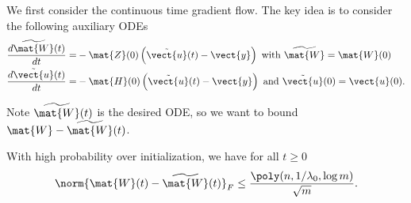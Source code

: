 We first consider the continuous time gradient flow.
The key idea is to consider the following auxiliary ODEs\begin{align*}
\frac{d\widetilde{\mat{W}}(t)}{dt} = &- \mat{Z}(0) \left(\tilde{\vect{u}}(t)-\vect{y}\right) \text{ with } \widetilde{\mat{W}} = \mat{W}(0) \\
\frac{d\tilde{\vect{u}}(t)}{dt} = &- \mat{H}(0)\left(\tilde{\vect{u}}(t)-\vect{y}\right) \text{ and }\tilde{\vect{u}}(0) = \vect{u}(0).
\end{align*} 

Note $\widetilde{\mat{W}}(t)$ is the desired ODE, so we want to bound $\mat{W}-\widetilde{\mat{W}}(t)$.
\begin{lem}\label{lem:gf_optimization}
With high probability over initialization, we have for all $t\ge 0$\begin{align*}
	\norm{\mat{W}(t)-\widetilde{\mat{W}}(t)}_F \le \frac{\poly(n,1/\lambda_0,\log m)}{\sqrt{m}}.
\end{align*}
\end{lem}



